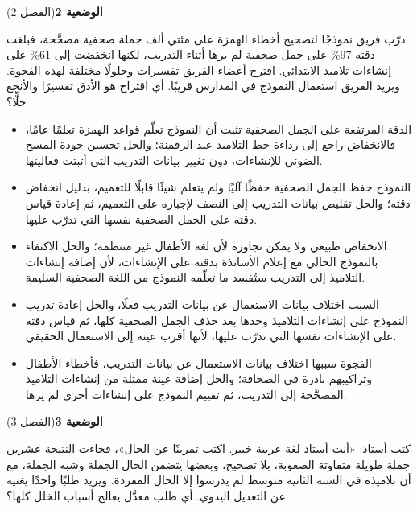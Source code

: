 \documentclass[11pt,a4paper]{article}
\begin{document}
\par\vspace{6pt}
\noindent
{\large\khatt\textbf{الوضعية 2}}\hfill{\small(الفصل 2)}\par\nopagebreak\vspace{3pt}
\setlength{\fboxsep}{7pt}\colorbox{gray!10}{\parbox{\dimexpr\linewidth-14pt}{درّب فريق نموذجًا لتصحيح أخطاء الهمزة على مئتي ألف جملة صحفية مصحَّحة، فبلغت دقته 97\% على جمل صحفية لم يرها أثناء التدريب، لكنها انخفضت إلى 61\% على إنشاءات تلاميذ الابتدائي. اقترح أعضاء الفريق تفسيرات وحلولًا مختلفة لهذه الفجوة. ويريد الفريق استعمال النموذج في المدارس قريبًا. أي اقتراح هو الأدق تفسيرًا والأنجع حلًّا؟}}\par\nopagebreak
\begin{itemize}[leftmargin=1.0cm, labelsep=6pt, itemsep=3pt, topsep=4pt, parsep=0pt]
  \item[\textbf{أ)}] الدقة المرتفعة على الجمل الصحفية تثبت أن النموذج تعلّم قواعد الهمزة تعلمًا عامًا، فالانخفاض راجع إلى رداءة خط التلاميذ عند الرقمنة؛ والحل تحسين جودة المسح الضوئي للإنشاءات، دون تغيير بيانات التدريب التي أثبتت فعاليتها.
  \item[\textbf{ب)}] النموذج حفظ الجمل الصحفية حفظًا آليًا ولم يتعلم شيئًا قابلًا للتعميم، بدليل انخفاض دقته؛ والحل تقليص بيانات التدريب إلى النصف لإجباره على التعميم، ثم إعادة قياس دقته على الجمل الصحفية نفسها التي تدرّب عليها.
  \item[\textbf{ج)}] الانخفاض طبيعي ولا يمكن تجاوزه لأن لغة الأطفال غير منتظمة؛ والحل الاكتفاء بالنموذج الحالي مع إعلام الأساتذة بدقته على الإنشاءات، لأن إضافة إنشاءات التلاميذ إلى التدريب ستُفسد ما تعلّمه النموذج من اللغة الصحفية السليمة.
  \item[\textbf{د)}] السبب اختلاف بيانات الاستعمال عن بيانات التدريب فعلًا، والحل إعادة تدريب النموذج على إنشاءات التلاميذ وحدها بعد حذف الجمل الصحفية كلها، ثم قياس دقته على الإنشاءات نفسها التي تدرّب عليها، لأنها أقرب عينة إلى الاستعمال الحقيقي.
  \item[\textbf{هـ)}] الفجوة سببها اختلاف بيانات الاستعمال عن بيانات التدريب، فأخطاء الأطفال وتراكيبهم نادرة في الصحافة؛ والحل إضافة عينة ممثلة من إنشاءات التلاميذ المصحَّحة إلى التدريب، ثم تقييم النموذج على إنشاءات أخرى لم يرها.
\end{itemize}
\par\vspace{6pt}
\noindent
{\large\khatt\textbf{الوضعية 3}}\hfill{\small(الفصل 3)}\par\nopagebreak\vspace{3pt}
\setlength{\fboxsep}{7pt}\colorbox{gray!10}{\parbox{\dimexpr\linewidth-14pt}{كتب أستاذ: «أنت أستاذ لغة عربية خبير. اكتب تمرينًا عن الحال»، فجاءت النتيجة عشرين جملة طويلة متفاوتة الصعوبة، بلا تصحيح، وبعضها يتضمن الحال الجملة وشبه الجملة، مع أن تلاميذه في السنة الثانية متوسط لم يدرسوا إلا الحال المفردة. ويريد طلبًا واحدًا يغنيه عن التعديل اليدوي. أي طلب معدَّل يعالج أسباب الخلل كلها؟}}\par\nopagebreak
\end{document}
